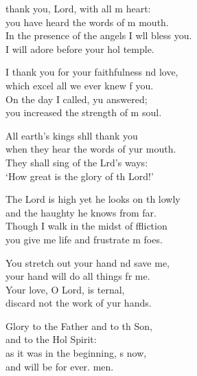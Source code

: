 \settowidth{\versewidth}{In the presence of the angels I will bless you. *}
\begin{psalmverse}%
  \begin{patverse}
 thank you, Lord, with all m heart:\Med\\
you have heard the words of m mouth.\\
In the presence of the angels I w\pointup{\i}ll bless you.\Med\\
I will adore before your hol temple.

I thank you for your faithfulness nd love,\Med\\
which excel all we ever knew f you.\\
On the day I called, yu answered;\Med\\
you increased the strength of m soul.

All earth’s kings shll thank you\Med\\
when they hear the words of yur mouth.\\
They shall sing of the Lrd’s ways:\Med\\
‘How great is the glory of th Lord!’

The Lord is high yet he looks on th lowly\Med\\
and the haughty he knows from far.\\
Though I walk in the midst of ffliction\Med\\
you give me life and frustrate m foes.

You stretch out your hand nd save me,\Med\\
your hand will do all things fr me.\\
Your love, O Lord, is ternal,\Med\\
discard not the work of yur hands.

Glory to the Father and to th Son,\Med\\
and to the Hol Spirit:\\
as it was in the beginning, \pointup{\i}s now,\Med\\
and will be for ever. men.
  \end{patverse}
\end{psalmverse}
